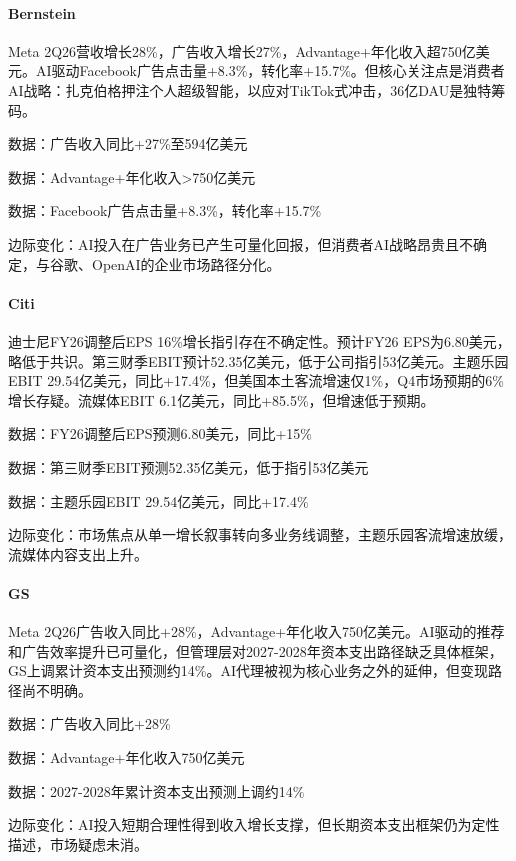 \documentclass[11pt]{ctexart}
\begin{document}
\paragraph{Bernstein} Meta 2Q26营收增长28\%，广告收入增长27\%，Advantage+年化收入超750亿美元。AI驱动Facebook广告点击量+8.3\%，转化率+15.7\%。但核心关注点是消费者AI战略：扎克伯格押注个人超级智能，以应对TikTok式冲击，36亿DAU是独特筹码。
{\small\color{refgray}数据：广告收入同比+27\%至594亿美元\par}
{\small\color{refgray}数据：Advantage+年化收入>750亿美元\par}
{\small\color{refgray}数据：Facebook广告点击量+8.3\%，转化率+15.7\%\par}
{\small\color{refgray}边际变化：AI投入在广告业务已产生可量化回报，但消费者AI战略昂贵且不确定，与谷歌、OpenAI的企业市场路径分化。\par}
\paragraph{Citi} 迪士尼FY26调整后EPS 16\%增长指引存在不确定性。预计FY26 EPS为6.80美元，略低于共识。第三财季EBIT预计52.35亿美元，低于公司指引53亿美元。主题乐园EBIT 29.54亿美元，同比+17.4\%，但美国本土客流增速仅1\%，Q4市场预期的6\%增长存疑。流媒体EBIT 6.1亿美元，同比+85.5\%，但增速低于预期。
{\small\color{refgray}数据：FY26调整后EPS预测6.80美元，同比+15\%\par}
{\small\color{refgray}数据：第三财季EBIT预测52.35亿美元，低于指引53亿美元\par}
{\small\color{refgray}数据：主题乐园EBIT 29.54亿美元，同比+17.4\%\par}
{\small\color{refgray}边际变化：市场焦点从单一增长叙事转向多业务线调整，主题乐园客流增速放缓，流媒体内容支出上升。\par}
\paragraph{GS} Meta 2Q26广告收入同比+28\%，Advantage+年化收入750亿美元。AI驱动的推荐和广告效率提升已可量化，但管理层对2027-2028年资本支出路径缺乏具体框架，GS上调累计资本支出预测约14\%。AI代理被视为核心业务之外的延伸，但变现路径尚不明确。
{\small\color{refgray}数据：广告收入同比+28\%\par}
{\small\color{refgray}数据：Advantage+年化收入750亿美元\par}
{\small\color{refgray}数据：2027-2028年累计资本支出预测上调约14\%\par}
{\small\color{refgray}边际变化：AI投入短期合理性得到收入增长支撑，但长期资本支出框架仍为定性描述，市场疑虑未消。\par}
\end{document}
